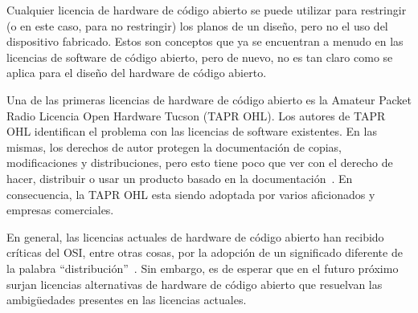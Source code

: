 

Cualquier licencia de hardware de código abierto se puede utilizar
para restringir (o en este caso, para no restringir) los planos de un
diseño, pero no el uso del dispositivo fabricado. Estos son conceptos
que ya se encuentran a menudo en las licencias de software de código 
abierto, pero de nuevo, no es tan claro como se aplica para el diseño
del hardware de código abierto.

Una de las primeras licencias de hardware de código abierto es la
Amateur Packet Radio Licencia Open Hardware Tucson (TAPR OHL). Los
autores de TAPR OHL identifican el problema con las licencias de
software existentes. En las mismas, los derechos de autor protegen la
documentación de copias, modificaciones y distribuciones, pero esto
tiene poco que ver con el derecho de hacer, distribuir o usar un
producto basado en la documentación~\cite{Etiqueta12}. En
consecuencia, la TAPR OHL esta siendo adoptada por varios aficionados
y empresas comerciales.



En general, las licencias actuales de hardware de código abierto han
recibido críticas del OSI, entre otras cosas, por la adopción de un
significado diferente de la palabra
``distribución''~\cite{Etiqueta13}. Sin embargo, es de esperar que en
el futuro próximo surjan licencias alternativas de hardware de código
abierto que resuelvan las ambigüedades presentes en las licencias
actuales.

